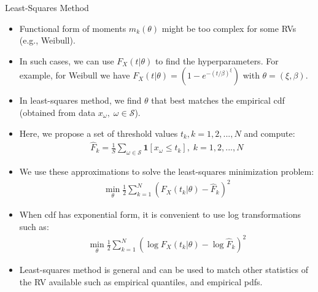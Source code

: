 \documentclass[9pt]{beamer}
\begin{document}
%
\begin{frame}{Least-Squares Method}

\begin{itemize}

\item Functional form of moments $m_k(\theta)$ might be too complex for some RVs (e.g., Weibull).

\item In such cases, we can use $F_X(t|\theta)$ to find the hyperparameters. For example, for Weibull we have $F_X(t|\theta)=(1-e^{-(t/\beta)^\xi})$ with $\theta=(\xi,\beta)$. 

\item In least-squares method, we find $\theta$ that best matches the empirical cdf (obtained from data $x_\omega,\; \omega \in \mathcal{S}$). 

\item Here, we propose a set of threshold values $t_k, k=1,2,...,N$ and compute:
\begin{align*}
\hat{F}_k=\frac{1}{S}\sum_{\omega \in \mathcal{S}}\mathbf{1}[x_\omega\leq t_k],\; k=1,2,...,N
\end{align*}

\item  We use these approximations to solve the least-squares minimization problem:
\begin{align*}
\min_\theta \frac{1}{2}\sum_{k=1}^N(F_X(t_k|\theta)-\hat{F}_k)^2
\end{align*}
\item When  cdf has exponential form, it is convenient to use log transformations such as:
 \begin{align*}
\min_\theta \frac{1}{2}\sum_{k=1}^N(\log F_X(t_k|\theta)-\log \hat{F}_k)^2
\end{align*}
\item Least-squares method is general and can be used to match other statistics of the RV available such as empirical quantiles, and empirical pdfs. 

\end{itemize}

\end{frame}
\end{document}
